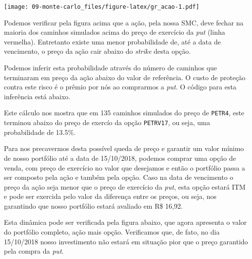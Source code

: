 \documentclass[]{book}
\newenvironment{Shaded}{\begin{snugshade}}{\end{snugshade}}
\newcommand{\DataTypeTok}[1]{\textcolor[rgb]{0.13,0.29,0.53}{#1}}
\newcommand{\KeywordTok}[1]{\textcolor[rgb]{0.13,0.29,0.53}{\textbf{#1}}}
\newcommand{\NormalTok}[1]{#1}
\newcommand{\OperatorTok}[1]{\textcolor[rgb]{0.81,0.36,0.00}{\textbf{#1}}}
\newcommand{\StringTok}[1]{\textcolor[rgb]{0.31,0.60,0.02}{#1}}
\theoremstyle{definition}
\theoremstyle{definition}
\theoremstyle{definition}
\theoremstyle{remark}
\begin{document}
\texttt{[image: 09-monte-carlo\_files/figure-latex/gr\_acao-1.pdf]}

Podemos verificar pela figura acima que a ação, pela nossa SMC, deve fechar na maioria dos caminhos simulados acima do preço de exercício da \emph{put} (linha vermelha). Entretanto existe uma menor probabilidade de, até a data de vencimento, o preço da ação cair abaixo do \emph{strike} desta opção.

Podemos inferir esta probabilidade através do número de caminhos que terminaram em preço da ação abaixo do valor de referência. O custo de proteção contra este risco é o prêmio por nós ao comprarmos a \emph{put}. O código para esta inferência está abaixo.

\begin{Shaded}
\end{Shaded}

Este cálculo nos mostra que em 135 caminhos simulados do preço de \texttt{PETR4}, este terminou abaixo do preço de exercío da opção \texttt{PETRV17}, ou seja, uma probabilidade de 13.5\%.

Para nos precavermos desta possível queda de preço e garantir um valor mínimo de nosso portfólio até a data de 15/10/2018, podemos comprar uma opção de venda, com preço de exercício no valor que desejamos e então o portfólio passa a ser composto pela ação e também pela opção. Caso na data de vencimento o preço da ação seja menor que o preço de exercício da \emph{put}, esta opção estará ITM e pode ser exercida pelo valor da diferença entre os preços, ou seja, nos garantindo que nosso portfólio estará avaliado em R\$ 16,92.

Esta dinâmica pode ser verificada pela figura abaixo, que agora apresenta o valor do portfólio completo, ação mais opção. Verificamos que, de fato, no dia 15/10/2018 nosso investimento não estará em situação pior que o preço garantido pela compra da \emph{put}.
\end{document}
